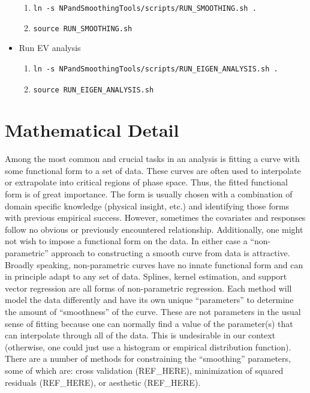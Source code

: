 \begin{itemize}
  \begin{enumerate}
  \itemsep1pt\parskip0pt
  \item
    \texttt{ln -s NPandSmoothingTools/scripts/RUN\_SMOOTHING.sh .}
  \item
    \texttt{source RUN\_SMOOTHING.sh}
  \end{enumerate}
\item
  Run EV analysis

  \begin{enumerate}
  \item
\begin{verbatim}
ln -s NPandSmoothingTools/scripts/RUN_EIGEN_ANALYSIS.sh .
\end{verbatim}
  \item
    \texttt{source RUN\_EIGEN\_ANALYSIS.sh}
  \end{enumerate}
\end{itemize}

\section{Mathematical Detail}\label{mathematical-detail}

Among the most common and crucial tasks in an analysis is fitting a
curve with some functional form to a set of data. These curves are often
used to interpolate or extrapolate into critical regions of phase space.
Thus, the fitted functional form is of great importance. The form is
usually chosen with a combination of domain specific knowledge (physical
insight, etc.) and identifying those forms with previous empirical
success. However, sometimes the covariates and responses follow no
obvious or previously encountered relationship. Additionally, one might
not wish to impose a functional form on the data. In either case a
``non-parametric'' approach to constructing a smooth curve from data is
attractive.\\Broadly speaking, non-parametric curves have no innate
functional form and can in principle adapt to any set of data. Splines,
kernel estimation, and support vector regression are all forms of
non-parametric regression. Each method will model the data differently
and have its own unique ``parameters'' to determine the amount of
``smoothness'' of the curve. These are not parameters in the usual sense
of fitting because one can normally find a value of the parameter(s)
that can interpolate through all of the data. This is undesirable in our
context (otherwise, one could just use a histogram or empirical
distribution function). There are a number of methods for constraining
the ``smoothing'' parameters, some of which are: cross validation
(REF\_HERE), minimization of squared residuals (REF\_HERE), or aesthetic
(REF\_HERE).

